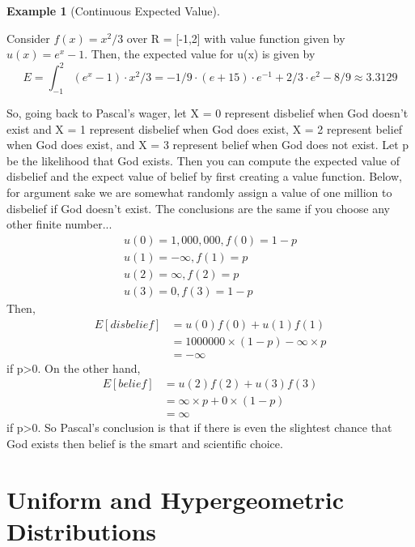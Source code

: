 \documentclass[10pt,]{book}
\theoremstyle{plain}
\theoremstyle{definition}
\theoremstyle{definition}
\newtheorem{example}[theorem]{Example}
\theoremstyle{definition}
\numberwithin{equation}{section}
\begin{document}
\begin{example}[Continuous Expected Value]\label{example-20}

	Consider \(f(x) = x^2/3\) over R = [-1,2] with value function given by \(u(x) = e^x - 1\). Then, the expected value for u(x) is given by
	\begin{equation*}E = \int_{-1}^2 (e^x-1) \cdot x^2/3 = -1/9 \cdot (e + 15) \cdot e^{-1} + 2/3 \cdot e^2 - 8/9 \approx 3.3129\end{equation*}
\end{example}
\par
So, going back to Pascal's wager, let X = 0 represent disbelief when God doesn't exist and X = 1 represent disbelief when God does exist, X = 2 represent belief when God does exist, and X = 3 represent belief when God does not exist. Let p be the likelihood that God exists. Then you can compute the expected value of disbelief and the expect value of belief by first creating a value function. Below, for argument sake we are somewhat randomly assign a value of one million to disbelief if God doesn't exist. The conclusions are the same if you choose any other finite number...
	\begin{gather*}
u(0) = 1,000,000, f(0) = 1-p\\
u(1) = -\infty, f(1) = p\\
u(2) = \infty, f(2) = p\\
u(3) = 0, f(3) = 1-p
\end{gather*}
	Then, 
	\begin{align*}
E[disbelief] & = u(0)f(0) + u(1)f(1)\\
& = 1000000 \times (1-p) - \infty \times p\\
& = -\infty
\end{align*}
	if p>0. On the other hand, 
	\begin{align*}
E[belief] & = u(2)f(2) + u(3)f(3)\\
& = \infty \times p + 0 \times (1-p)\\
& = \infty
\end{align*}
	if p>0. So Pascal's conclusion is that if there is even the slightest chance that God exists then belief is the smart and scientific choice.
\typeout{************************************************}
\typeout{************************************************}
\chapter[Uniform and Hypergeometric Distributions]{Uniform and Hypergeometric Distributions}\label{UniformHypergeometric}
\typeout{************************************************}
\typeout{************************************************}
\end{document}
